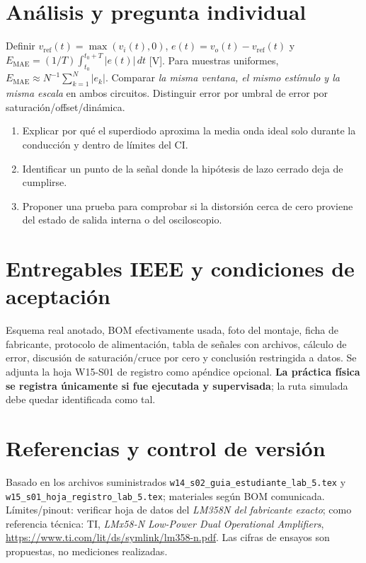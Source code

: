 \documentclass[10pt,a4paper]{article}
\begin{document}
\section{Análisis y pregunta individual}
Definir $v_{\mathrm{ref}}(t)=\max(v_i(t),0)$, $e(t)=v_o(t)-v_{\mathrm{ref}}(t)$ y $E_{\mathrm{MAE}}=(1/T)\int_{t_0}^{t_0+T}|e(t)|\,dt$ [V]. Para muestras uniformes, $E_{\mathrm{MAE}}\approx N^{-1}\sum_{k=1}^N |e_k|$. Comparar \emph{la misma ventana, el mismo estímulo y la misma escala} en ambos circuitos. Distinguir error por umbral de error por saturación/offset/dinámica.
\begin{enumerate}
\item Explicar por qué el superdiodo aproxima la media onda ideal solo durante la conducción y dentro de límites del CI.
\item Identificar un punto de la señal donde la hipótesis de lazo cerrado deja de cumplirse.
\item Proponer una prueba para comprobar si la distorsión cerca de cero proviene del estado de salida interna o del osciloscopio.
\end{enumerate}
\section{Entregables IEEE y condiciones de aceptación}
Esquema real anotado, BOM efectivamente usada, foto del montaje, ficha de fabricante, protocolo de alimentación, tabla de señales con archivos, cálculo de error, discusión de saturación/cruce por cero y conclusión restringida a datos. Se adjunta la hoja W15-S01 de registro como apéndice opcional. \textbf{La práctica física se registra únicamente si fue ejecutada y supervisada}; la ruta simulada debe quedar identificada como tal.
\section*{Referencias y control de versión}
Basado en los archivos suministrados \texttt{w14\_s02\_guia\_estudiante\_lab\_5.tex} y \texttt{w15\_s01\_hoja\_registro\_lab\_5.tex}; materiales según BOM comunicada. Límites/pinout: verificar hoja de datos del \emph{LM358N del fabricante exacto}; como referencia técnica: TI, \emph{LMx58-N Low-Power Dual Operational Amplifiers}, \url{https://www.ti.com/lit/ds/symlink/lm358-n.pdf}. Las cifras de ensayos son propuestas, no mediciones realizadas.
\end{document}
